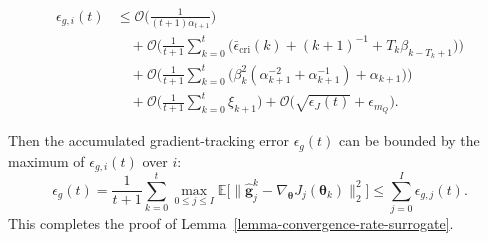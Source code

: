 \documentclass{IEEEtran}
\begin{document}
\begin{equation}
\begin{aligned}
\epsilon_{g,i}(t)
&\le \mathcal{O}\!\Big(\frac{1}{(t+1)\alpha_{t+1}}\Big)\\
&\quad +\mathcal{O}\!\Bigg(\frac{1}{t+1}\sum_{k=0}^{t}\Big(
\bar{\epsilon}_{\mathrm{cri}}(k)+(k+1)^{-1}+T_k\beta_{k-T_k+1}\Big)\Bigg)\\
&\quad +\mathcal{O}\!\Bigg(\frac{1}{t+1}\sum_{k=0}^{t}\Big(
\beta_k^2(\alpha_{k+1}^{-2}+\alpha_{k+1}^{-1})+\alpha_{k+1}\Big)\Bigg)\\
&\quad +\mathcal{O}\!\Bigg(\frac{1}{t+1}\sum_{k=0}^{t}\xi_{k+1}\Bigg)
{}+\mathcal{O}\!\Big(\sqrt{\epsilon_J(t)}+\epsilon_{m_Q}\Big).
\end{aligned}
\label{eq:appD_epsgi_final_fixed_i}
\end{equation}

Then the accumulated gradient-tracking error $\epsilon_g(t)$ can be bounded by the maximum of $\epsilon_{g,i}(t)$ over $i$:
\begin{equation}
\epsilon_g(t)=\frac{1}{t+1}\sum_{k=0}^{t}\max_{0\le j\le I}\mathbb{E}\Big[\big\|\hat{\boldsymbol{g}}_j^k-\nabla_{\boldsymbol{\theta}}J_j(\boldsymbol{\theta}_k)\big\|_2^2\Big]
\le \sum_{j=0}^{I}\epsilon_{g,j}(t).
\end{equation}
This completes the proof of Lemma~\ref{lemma-convergence-rate-surrogate}. 





\end{document}
